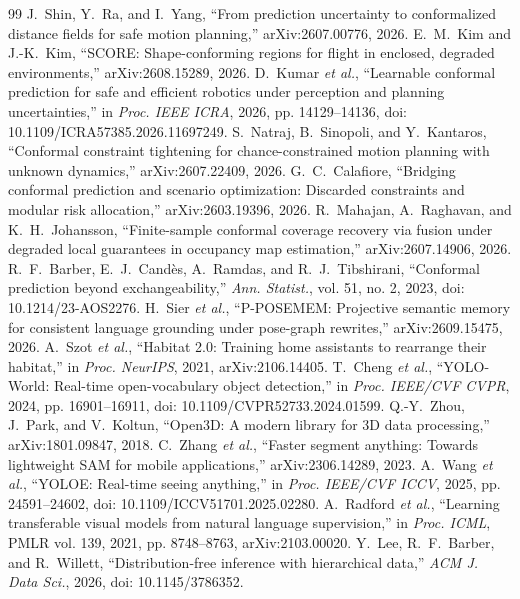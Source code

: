 \documentclass[conference]{IEEEtran}
\theoremstyle{definition}
\begin{document}
\begin{thebibliography}{99}
 J.~Shin, Y.~Ra, and I.~Yang, ``From prediction uncertainty to conformalized distance fields for safe motion planning,'' arXiv:2607.00776, 2026.
 E.~M.~Kim and J.-K.~Kim, ``SCORE: Shape-conforming regions for flight in enclosed, degraded environments,'' arXiv:2608.15289, 2026.
 D.~Kumar \emph{et al.}, ``Learnable conformal prediction for safe and efficient robotics under perception and planning uncertainties,'' in \emph{Proc. IEEE ICRA}, 2026, pp. 14129--14136, doi: 10.1109/ICRA57385.2026.11697249.
 S.~Natraj, B.~Sinopoli, and Y.~Kantaros, ``Conformal constraint tightening for chance-constrained motion planning with unknown dynamics,'' arXiv:2607.22409, 2026.
 G.~C.~Calafiore, ``Bridging conformal prediction and scenario optimization: Discarded constraints and modular risk allocation,'' arXiv:2603.19396, 2026.
 R.~Mahajan, A.~Raghavan, and K.~H.~Johansson, ``Finite-sample conformal coverage recovery via fusion under degraded local guarantees in occupancy map estimation,'' arXiv:2607.14906, 2026.
 R.~F.~Barber, E.~J.~Cand\`es, A.~Ramdas, and R.~J.~Tibshirani, ``Conformal prediction beyond exchangeability,'' \emph{Ann. Statist.}, vol. 51, no. 2, 2023, doi: 10.1214/23-AOS2276.
 H.~Sier \emph{et al.}, ``P-POSEMEM: Projective semantic memory for consistent language grounding under pose-graph rewrites,'' arXiv:2609.15475, 2026.
 A.~Szot \emph{et al.}, ``Habitat 2.0: Training home assistants to rearrange their habitat,'' in \emph{Proc. NeurIPS}, 2021, arXiv:2106.14405.
 T.~Cheng \emph{et al.}, ``YOLO-World: Real-time open-vocabulary object detection,'' in \emph{Proc. IEEE/CVF CVPR}, 2024, pp. 16901--16911, doi: 10.1109/CVPR52733.2024.01599.
 Q.-Y.~Zhou, J.~Park, and V.~Koltun, ``Open3D: A modern library for 3D data processing,'' arXiv:1801.09847, 2018.
 C.~Zhang \emph{et al.}, ``Faster segment anything: Towards lightweight SAM for mobile applications,'' arXiv:2306.14289, 2023.
 A.~Wang \emph{et al.}, ``YOLOE: Real-time seeing anything,'' in \emph{Proc. IEEE/CVF ICCV}, 2025, pp. 24591--24602, doi: 10.1109/ICCV51701.2025.02280.
 A.~Radford \emph{et al.}, ``Learning transferable visual models from natural language supervision,'' in \emph{Proc. ICML}, PMLR vol. 139, 2021, pp. 8748--8763, arXiv:2103.00020.
 Y.~Lee, R.~F.~Barber, and R.~Willett, ``Distribution-free inference with hierarchical data,'' \emph{ACM J. Data Sci.}, 2026, doi: 10.1145/3786352.

\end{thebibliography}
\end{document}
